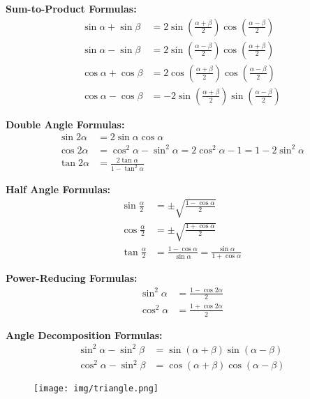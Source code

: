 \documentclass[11pt]{../../TexTemplate/elegantbook}
\begin{document}
\textbf{Sum-to-Product Formulas:}
\begin{align*}
\sin\alpha + \sin\beta &= 2 \sin\left( \frac{\alpha + \beta}{2} \right) \cos\left( \frac{\alpha - \beta}{2} \right) \\
\sin\alpha - \sin\beta &= 2 \sin\left( \frac{\alpha - \beta}{2} \right) \cos\left( \frac{\alpha + \beta}{2} \right) \\
\cos\alpha + \cos\beta &= 2 \cos\left( \frac{\alpha + \beta}{2} \right) \cos\left( \frac{\alpha - \beta}{2} \right) \\
\cos\alpha - \cos\beta &= -2 \sin\left( \frac{\alpha + \beta}{2} \right) \sin\left( \frac{\alpha - \beta}{2} \right)
\end{align*}

\textbf{Double Angle Formulas:}
\begin{align*}
\sin 2\alpha &= 2\sin\alpha \cos\alpha \\
\cos 2\alpha &= \cos^2\alpha - \sin^2\alpha = 2\cos^2\alpha - 1 = 1 - 2\sin^2\alpha \\
\tan 2\alpha &= \frac{2\tan\alpha}{1 - \tan^2\alpha}
\end{align*}

\textbf{Half Angle Formulas:}
\begin{align*}
\sin \frac{\alpha}{2} &= \pm \sqrt{ \frac{1 - \cos\alpha}{2} } \\
\cos \frac{\alpha}{2} &= \pm \sqrt{ \frac{1 + \cos\alpha}{2} } \\
\tan \frac{\alpha}{2} &= \frac{1 - \cos\alpha}{\sin\alpha} = \frac{\sin\alpha}{1 + \cos\alpha}
\end{align*}

\textbf{Power-Reducing Formulas:}
\begin{align*}
\sin^2\alpha &= \frac{1 - \cos 2\alpha}{2} \\
\cos^2\alpha &= \frac{1 + \cos 2\alpha}{2}
\end{align*}

\textbf{Angle Decomposition Formulas:}
\begin{align*}
\sin^2\alpha - \sin^2\beta &= \sin(\alpha + \beta) \sin(\alpha - \beta) \\
\cos^2\alpha - \sin^2\beta &= \cos(\alpha + \beta) \cos(\alpha - \beta)
\end{align*}

\begin{figure}[h]
    \centering
    \texttt{[image: img/triangle.png]}
\end{figure}
\end{document}

